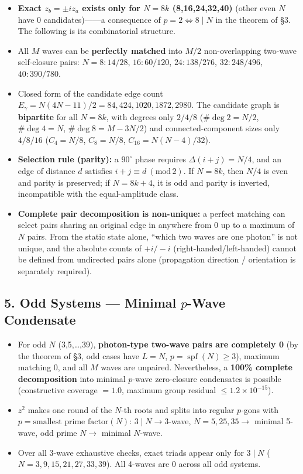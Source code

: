 \documentclass[
  a4paper,
]{ltjsarticle}
\providecommand{\tightlist}{%
  \setlength{\itemsep}{0pt}\setlength{\parskip}{0pt}}
\begin{document}
\begin{itemize}
\tightlist
\item
  \textbf{Exact \(z_b=\pm i z_a\) exists only for \(N=8k\)
  (8,16,24,32,40)} (other even \(N\) have 0 candidates)------a
  consequence of \(p=2\iff8\mid N\) in the theorem of §3. The following
  is its combinatorial structure.
\item
  All \(M\) waves can be \textbf{perfectly matched} into \(M/2\)
  non-overlapping two-wave self-closure pairs: \(N=8{:}14/28\),
  \(16{:}60/120\), \(24{:}138/276\), \(32{:}248/496\), \(40{:}390/780\).
\item
  Closed form of the candidate edge count
  \(E_\gamma=N(4N-11)/2=84,424,1020,1872,2980\). The candidate graph is
  \textbf{bipartite} for all \(N=8k\), with degrees only \(2/4/8\)
  (\(\#\deg2=N/2\), \(\#\deg4=N\), \(\#\deg8=M-3N/2\)) and
  connected-component sizes only \(4/8/16\) (\(C_4=N/8\), \(C_8=N/8\),
  \(C_{16}=N(N-4)/32\)).
\item
  \textbf{Selection rule (parity):} a \(90^\circ\) phase requires
  \(\Delta(i+j)=N/4\), and an edge of distance \(d\) satisfies
  \(i+j\equiv d\ (\mathrm{mod}\,2)\). If \(N=8k\), then \(N/4\) is even
  and parity is preserved; if \(N=8k+4\), it is odd and parity is
  inverted, incompatible with the equal-amplitude class.
\item
  \textbf{Complete pair decomposition is non-unique:} a perfect matching
  can select pairs sharing an original edge in anywhere from 0 up to a
  maximum of \(N\) pairs. From the static state alone, ``which two waves
  are one photon'' is not unique, and the absolute counts of \(+i/-i\)
  (right-handed/left-handed) cannot be defined from undirected pairs
  alone (propagation direction / orientation is separately required).
\end{itemize}

\subsection{\texorpdfstring{5. Odd Systems --- Minimal \(p\)-Wave
Condensate}{5. Odd Systems --- Minimal p-Wave Condensate}}\label{odd-systems-minimal-p-wave-condensate}

\begin{itemize}
\tightlist
\item
  For odd \(N\) (3,5,\ldots,39), \textbf{photon-type two-wave pairs are
  completely 0} (by the theorem of §3, odd cases have \(L=N\),
  \(p=\operatorname{spf}(N)\ge3\)), maximum matching 0, and all \(M\)
  waves are unpaired. Nevertheless, a \textbf{100\% complete
  decomposition} into minimal \(p\)-wave zero-closure condensates is
  possible (constructive coverage \(=1.0\), maximum group residual
  \(\le1.2\times10^{-15}\)).
\item
  \(z^2\) makes one round of the \(N\)-th roots and splits into regular
  \(p\)-gons with \(p=\text{smallest prime factor}(N)\):
  \(3\mid N\to3\)-wave, \(N=5,25,35\to\) minimal 5-wave, odd prime
  \(N\to\) minimal \(N\)-wave.
\item
  Over all 3-wave exhaustive checks, exact triads appear only for
  \(3\mid N\) (\(N=3,9,15,21,27,33,39\)). All 4-waves are 0 across all
  odd systems.
\end{itemize}
\end{document}
